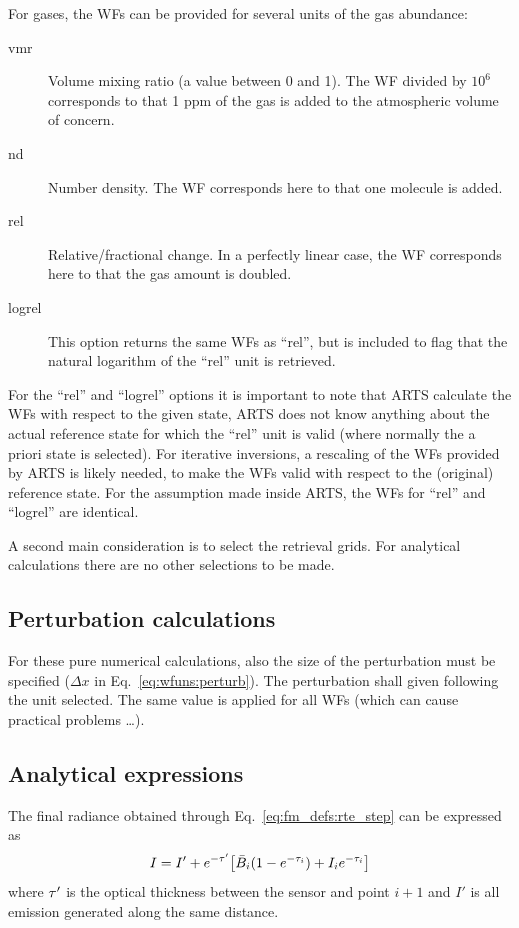 For gases, the WFs can be provided for several units of the gas abundance:
\begin{description}
\item[vmr] Volume mixing ratio (a value between 0 and 1). The WF divided by
  $10^6$ corresponds to that 1 ppm of the gas is added to the atmospheric
  volume of concern.
\item[nd] Number density. The WF corresponds here to that one molecule is added.
\item[rel] Relative/fractional change. In a perfectly linear case, the WF
  corresponds here to that the gas amount is doubled.
\item[logrel] This option returns the same WFs as ``rel'', but is included to
  flag that the natural logarithm of the ``rel'' unit is retrieved.
\end{description}
For the ``rel'' and ``logrel'' options it is important to note that ARTS
calculate the WFs with respect to the given state, ARTS does not know anything
about the actual reference state for which the ``rel'' unit is valid (where
normally the a priori state is selected). For iterative inversions, a rescaling
of the WFs provided by ARTS is likely needed, to make the WFs valid with
respect to the (original) reference state. For the assumption made inside ARTS,
the WFs for ``rel'' and ``logrel'' are identical.

A second main consideration is to select the retrieval grids. For analytical
calculations there are no other selections to be made. 


\subsection{Perturbation calculations}
%
For these pure numerical calculations, also the size of the perturbation must
be specified ($\Delta x$ in Eq.~\ref{eq:wfuns:perturb}). The perturbation shall
given following the unit selected. The same value is applied for all WFs (which
can cause practical problems \dots).


\subsection{Analytical expressions}
%
The final radiance obtained through Eq.~\ref{eq:fm_defs:rte_step} can be
expressed as
\begin{equation}
  \label{eq:I4J}
  I = I'+ e^{-\tau'}\!\left[ \bar{B}_i(1-e^{-\tau_{i}})+I_ie^{-\tau_{i}}\right]
\end{equation}
where $\tau'$ is the optical thickness between the sensor and point $i+1$
and $I'$ is all emission generated along the same distance.

